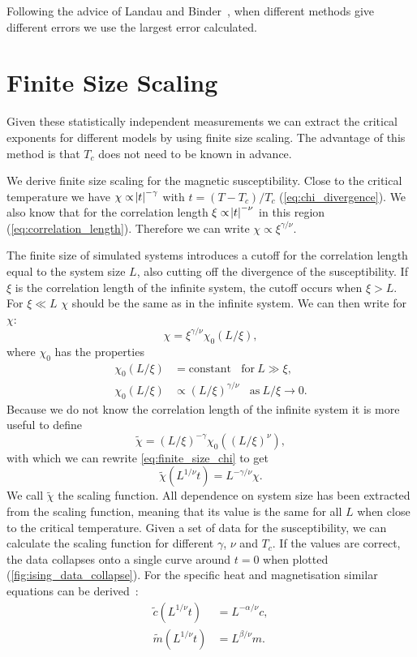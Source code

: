 \documentclass[11pt, a4paper]{report} %
\begin{document}
Following the advice of Landau and Binder~\cite{landau:2015}, when different methods give different errors we use the largest error calculated.


\section{Finite Size Scaling}
Given these statistically independent measurements we can extract the critical exponents for different models by using finite size scaling.
The advantage of this method is that \(T_c\) does not need to be known in advance.

We derive finite size scaling for the magnetic susceptibility.
Close to the critical temperature we have \(\chi \propto \abs{t} ^{-\gamma}\) with \(t = (T-T_c) / T_c\) (\cref{eq:chi_divergence}).
We also know that for the correlation length \(\xi \propto \abs{t}^{-\nu}\) in this region (\cref{eq:correlation_length}).
Therefore we can write \(\chi \propto \xi^{\gamma /\nu}\).

The finite size of simulated systems introduces a cutoff for the correlation length equal to the system size \(L\), also cutting off the divergence of the susceptibility.
If \(\xi\) is the correlation length of the infinite system, the cutoff occurs when \(\xi > L\).
For \(\xi \ll L\) \(\chi\) should be the same as in the infinite system.
We can then write for \(\chi\):
\begin{equation}\label{eq:finite_size_chi}
	\chi = \xi^{\gamma/\nu} \chi_0(L/\xi),
\end{equation}
where \(\chi_0\) has the properties
\begin{align}
	\chi_0(L/\xi) &= \mathrm{constant}\ \ \ \ \mathrm{for}\ L \gg \xi,\\
	\chi_0(L/\xi) &\propto (L/\xi)^{\gamma/\nu}\ \ \ \ \mathrm{as}\ L/\xi \to 0.
\end{align}
Because we do not know the correlation length of the infinite system it is more useful to define
\begin{equation}
	\widetilde{\chi} = (L/\xi)^{-\gamma} \chi_0((L/\xi)^{\nu}),
\end{equation}
with which we can rewrite \cref{eq:finite_size_chi} to get
\begin{equation}
	\widetilde{\chi}(L^{1/\nu}t) = L^{-\gamma/\nu}\chi.
\end{equation}
We call \(\tilde{\chi}\) the scaling function.
All dependence on system size has been extracted from the scaling function, meaning that its value is the same for all \(L\) when close to the critical temperature.
Given a set of data for the susceptibility, we can calculate the scaling function for different \(\gamma\), \(\nu\) and \(T_c\).
If the values are correct, the data collapses onto a single curve around \(t=0\) when plotted (\cref{fig:ising_data_collapse}).
For the specific heat and magnetisation similar equations can be derived~\cite{newman:1999}:
\begin{align}
	\widetilde{c}(L^{1/\nu}t) &= L^{-\alpha/\nu} c, \\
	\widetilde{m}(L^{1/\nu}t) &= L^{\beta/\nu} m.\label{eq:magnetisation_scaling}
\end{align}
\end{document}
